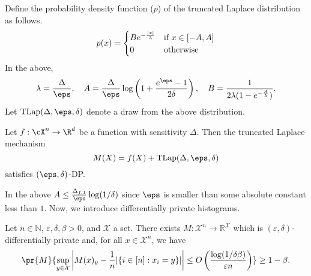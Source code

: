 \begin{lemma}\label{lem:truncated-laplace}
    Define the probability density function ($p$) of
    the truncated Laplace distribution as follows.
    \[
    p(x) =
    \begin{cases}
        Be^{-\frac{\left| x \right|}{\lambda}} & \text{if $x \in [-A,A]$}\\
        0 & \text{otherwise}
    \end{cases}
    \]
    In the above,
    $$
        \lambda = \frac{\Delta}{\eps},~~~
        A = \frac{\Delta}{\eps}\log\left(1+\frac{e^\eps - 1}{2\delta}\right),~~~
        B = \frac{1}{2\lambda(1-e^{-\frac{A}{\lambda}})}.
    $$
    Let $\TLap(\Delta,\eps,\delta)$ denote a draw
    from the above distribution. 
    
    Let $f : \cX^n \to \R^d$ be a function
    with sensitivity $\Delta$. Then the truncated
    Laplace mechanism
    $$M(X) = f(X) + \TLap(\Delta,\eps,\delta)$$
    satisfies $(\eps,\delta)$-DP.
\end{lemma}

In the above $A \leq \tfrac{\Delta_{f,1}}{\eps}\log(1/\delta)$
since $\eps$ is smaller than some absolute constant less than
$1$. Now, we introduce differentially private histograms.

\begin{lemma}\label{lem:priv-hist}
    Let $n \in \mathbb{N}$, $\varepsilon,\delta,\beta>0$, and $\mathcal{X}$ a set.
    There exists $M : \mathcal{X}^n \to \mathbb{R}^{\mathcal{X}}$ which is $(\varepsilon,\delta)$-differentially private and, for all $x \in \mathcal{X}^n$, we have \[\pr{M}{\sup_{y \in \mathcal{X}} \left|M(x)_y - \frac1n |\{ i \in [n] : x_i = y\}| \right| \le O\left(\frac{\log(1/\delta\beta)}{\varepsilon n}\right) } \ge 1-\beta.\]
\end{lemma}

